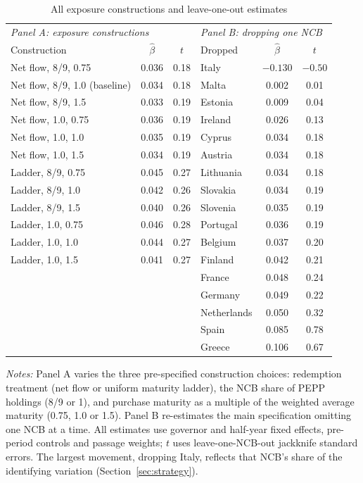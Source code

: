 \documentclass[11pt]{article}
\theoremstyle{plain}
\begin{document}
\begin{table}[t]\centering\small
\begin{threeparttable}
\caption{All exposure constructions and leave-one-out estimates}\label{tab:all}
\begin{tabular}{lcc@{\hskip 2em}lcc}
\toprule
\multicolumn{3}{l}{\textit{Panel A: exposure constructions}} & \multicolumn{3}{l}{\textit{Panel B: dropping one NCB}} \\
Construction & $\hat\beta$ & $t$ & Dropped & $\hat\beta$ & $t$ \\
\midrule
Net flow, 8/9, 0.75 & 0.036 & 0.18 & Italy & $-0.130$ & $-0.50$ \\
Net flow, 8/9, 1.0 (baseline) & 0.034 & 0.18 & Malta & 0.002 & 0.01 \\
Net flow, 8/9, 1.5 & 0.033 & 0.19 & Estonia & 0.009 & 0.04 \\
Net flow, 1.0, 0.75 & 0.036 & 0.19 & Ireland & 0.026 & 0.13 \\
Net flow, 1.0, 1.0 & 0.035 & 0.19 & Cyprus & 0.034 & 0.18 \\
Net flow, 1.0, 1.5 & 0.034 & 0.19 & Austria & 0.034 & 0.18 \\
Ladder, 8/9, 0.75 & 0.045 & 0.27 & Lithuania & 0.034 & 0.18 \\
Ladder, 8/9, 1.0 & 0.042 & 0.26 & Slovakia & 0.034 & 0.19 \\
Ladder, 8/9, 1.5 & 0.040 & 0.26 & Slovenia & 0.035 & 0.19 \\
Ladder, 1.0, 0.75 & 0.046 & 0.28 & Portugal & 0.036 & 0.19 \\
Ladder, 1.0, 1.0 & 0.044 & 0.27 & Belgium & 0.037 & 0.20 \\
Ladder, 1.0, 1.5 & 0.041 & 0.27 & Finland & 0.042 & 0.21 \\
 & & & France & 0.048 & 0.24 \\
 & & & Germany & 0.049 & 0.22 \\
 & & & Netherlands & 0.050 & 0.32 \\
 & & & Spain & 0.085 & 0.78 \\
 & & & Greece & 0.106 & 0.67 \\
\bottomrule
\end{tabular}
\begin{tablenotes}\footnotesize
\item \textit{Notes:} Panel A varies the three pre-specified construction choices: redemption treatment (net flow or uniform maturity ladder), the NCB share of PEPP holdings (8/9 or 1), and purchase maturity as a multiple of the weighted average maturity (0.75, 1.0 or 1.5). Panel B re-estimates the main specification omitting one NCB at a time. All estimates use governor and half-year fixed effects, pre-period controls and passage weights; $t$ uses leave-one-NCB-out jackknife standard errors. The largest movement, dropping Italy, reflects that NCB's share of the identifying variation (Section~\ref{sec:strategy}).
\end{tablenotes}
\end{threeparttable}
\end{table}
\end{document}
